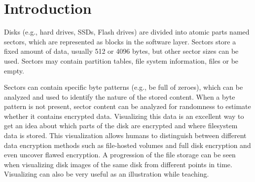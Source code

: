 \documentclass[
  digital, %
  color,   %
  oneside, %
  lof,     %
  nolot,     %
]{fithesis4}
\begin{document}

\chapter*{Introduction}
\label{chap:introduction}

Disks (e.g., hard drives, SSDs, Flash drives) are divided into atomic parts named sectors, which are represented as blocks in the software layer.
Sectors store a fixed amount of data, usually 512 or 4096 bytes, but other sector sizes can be used.
Sectors may contain partition tables, file system information, files or be empty.

Sectors can contain specific byte patterns (e.g., be full of zeroes), which can be analyzed and used to identify the nature of the stored content.
When a byte pattern is not present, sector content can be analyzed for randomness to estimate whether it contains encrypted data.
Visualizing this data is an excellent way to get an idea about which parts of the disk are encrypted and where filesystem data is stored.
This visualization allows humans to distinguish between different data encryption methods such as file-hosted volumes and full disk encryption and even uncover flawed encryption.
A progression of the file storage can be seen when visualizing disk images of the same disk from different points in time.
Visualizing can also be very useful as an illustration while teaching.
\end{document}
